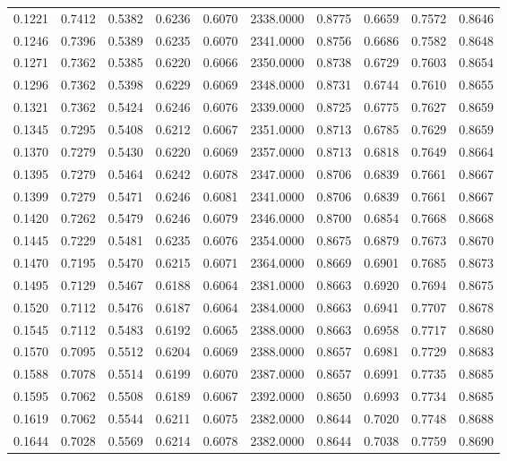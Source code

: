 \begin{tabular}{rrrrrrrrrr}
0.1221 & 0.7412 & 0.5382 & 0.6236 & 0.6070 & 2338.0000 & 0.8775 & 0.6659 & 0.7572 & 0.8646 \\
0.1246 & 0.7396 & 0.5389 & 0.6235 & 0.6070 & 2341.0000 & 0.8756 & 0.6686 & 0.7582 & 0.8648 \\
0.1271 & 0.7362 & 0.5385 & 0.6220 & 0.6066 & 2350.0000 & 0.8738 & 0.6729 & 0.7603 & 0.8654 \\
0.1296 & 0.7362 & 0.5398 & 0.6229 & 0.6069 & 2348.0000 & 0.8731 & 0.6744 & 0.7610 & 0.8655 \\
0.1321 & 0.7362 & 0.5424 & 0.6246 & 0.6076 & 2339.0000 & 0.8725 & 0.6775 & 0.7627 & 0.8659 \\
0.1345 & 0.7295 & 0.5408 & 0.6212 & 0.6067 & 2351.0000 & 0.8713 & 0.6785 & 0.7629 & 0.8659 \\
0.1370 & 0.7279 & 0.5430 & 0.6220 & 0.6069 & 2357.0000 & 0.8713 & 0.6818 & 0.7649 & 0.8664 \\
0.1395 & 0.7279 & 0.5464 & 0.6242 & 0.6078 & 2347.0000 & 0.8706 & 0.6839 & 0.7661 & 0.8667 \\
0.1399 & 0.7279 & 0.5471 & 0.6246 & 0.6081 & 2341.0000 & 0.8706 & 0.6839 & 0.7661 & 0.8667 \\
0.1420 & 0.7262 & 0.5479 & 0.6246 & 0.6079 & 2346.0000 & 0.8700 & 0.6854 & 0.7668 & 0.8668 \\
0.1445 & 0.7229 & 0.5481 & 0.6235 & 0.6076 & 2354.0000 & 0.8675 & 0.6879 & 0.7673 & 0.8670 \\
0.1470 & 0.7195 & 0.5470 & 0.6215 & 0.6071 & 2364.0000 & 0.8669 & 0.6901 & 0.7685 & 0.8673 \\
0.1495 & 0.7129 & 0.5467 & 0.6188 & 0.6064 & 2381.0000 & 0.8663 & 0.6920 & 0.7694 & 0.8675 \\
0.1520 & 0.7112 & 0.5476 & 0.6187 & 0.6064 & 2384.0000 & 0.8663 & 0.6941 & 0.7707 & 0.8678 \\
0.1545 & 0.7112 & 0.5483 & 0.6192 & 0.6065 & 2388.0000 & 0.8663 & 0.6958 & 0.7717 & 0.8680 \\
0.1570 & 0.7095 & 0.5512 & 0.6204 & 0.6069 & 2388.0000 & 0.8657 & 0.6981 & 0.7729 & 0.8683 \\
0.1588 & 0.7078 & 0.5514 & 0.6199 & 0.6070 & 2387.0000 & 0.8657 & 0.6991 & 0.7735 & 0.8685 \\
0.1595 & 0.7062 & 0.5508 & 0.6189 & 0.6067 & 2392.0000 & 0.8650 & 0.6993 & 0.7734 & 0.8685 \\
0.1619 & 0.7062 & 0.5544 & 0.6211 & 0.6075 & 2382.0000 & 0.8644 & 0.7020 & 0.7748 & 0.8688 \\
0.1644 & 0.7028 & 0.5569 & 0.6214 & 0.6078 & 2382.0000 & 0.8644 & 0.7038 & 0.7759 & 0.8690 \\

\end{tabular}
